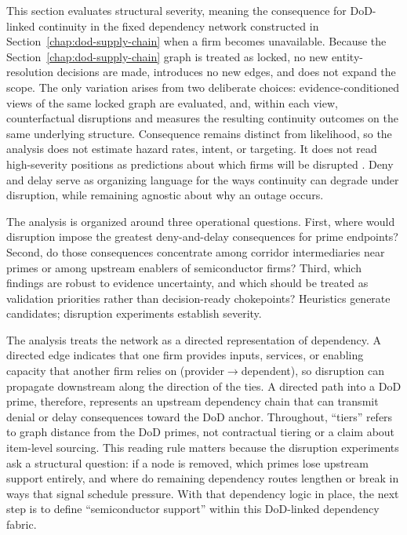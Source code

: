 This section evaluates structural severity, meaning the consequence for DoD-linked continuity in the fixed dependency network constructed in Section~\ref{chap:dod-supply-chain} when a firm becomes unavailable. Because the Section~\ref{chap:dod-supply-chain} graph is treated as locked, no new entity-resolution decisions are made, introduces no new edges, and does not expand the scope. The only variation arises from two deliberate choices: evidence-conditioned views of the same locked graph are evaluated, and, within each view, counterfactual disruptions and measures the resulting continuity outcomes on the same underlying structure. Consequence remains distinct from likelihood, so the analysis does not estimate hazard rates, intent, or targeting. It does not read high-severity positions as predictions about which firms will be disrupted \parencite{joint_task_force_transformation_initiative_guide_2012, kaplan_quantitative_1981}. Deny and delay serve as organizing language for the ways continuity can degrade under disruption, while remaining agnostic about why an outage occurs.

The analysis is organized around three operational questions. First, where would disruption impose the greatest deny-and-delay consequences for prime endpoints? Second, do those consequences concentrate among corridor intermediaries near primes or among upstream enablers of semiconductor firms? Third, which findings are robust to evidence uncertainty, and which should be treated as validation priorities rather than decision-ready chokepoints? Heuristics generate candidates; disruption experiments establish severity.

The analysis treats the network as a directed representation of dependency. A directed edge indicates that one firm provides inputs, services, or enabling capacity that another firm relies on (provider$\rightarrow$dependent), so disruption can propagate downstream along the direction of the ties. A directed path into a DoD prime, therefore, represents an upstream dependency chain that can transmit denial or delay consequences toward the DoD anchor. Throughout, ``tiers'' refers to graph distance from the DoD primes, not contractual tiering or a claim about item-level sourcing. This reading rule matters because the disruption experiments ask a structural question: if a node is removed, which primes lose upstream support entirely, and where do remaining dependency routes lengthen or break in ways that signal schedule pressure. With that dependency logic in place, the next step is to define ``semiconductor support'' within this DoD-linked dependency fabric.

